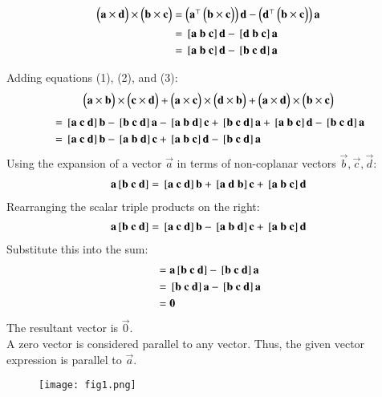\documentclass[journal]{IEEEtran}
\begin{document}
\begin{align}
\myvec{\vec{a} \times\vec{d}} \times\myvec{\vec{b} \times\vec{c}}&=
\myvec{\vec{a}^\top \myvec{\vec{b} \times \vec{c}}} \vec{d} - \myvec{\vec{d}^\top \myvec{\vec{b} \times \vec{c}}} \vec{a}\\
&=\sbrak{\vec{a} \ \vec{b} \ \vec{c}}\vec{d} - \sbrak{\vec{d} \ \vec{b} \ \vec{c}}\vec{a}  \\
&= \sbrak{\vec{a} \ \vec{b} \ \vec{c}}\vec{d} - \sbrak{\vec{b} \ \vec{c} \ \vec{d}}\vec{a}
\end{align}

Adding equations (1), (2), and (3):
\begin{align}
\begin{pmatrix}\mathbf{a} \times\mathbf{b}\end{pmatrix} \times\begin{pmatrix}\mathbf{c} \times\mathbf{d}\end{pmatrix} + \begin{pmatrix}\mathbf{a} \times\mathbf{c}\end{pmatrix} \times\begin{pmatrix}\mathbf{d} \times\mathbf{b}\end{pmatrix} + \begin{pmatrix}\mathbf{a} \times\mathbf{d}\end{pmatrix} \times\begin{pmatrix}\mathbf{b} \times\mathbf{c}\end{pmatrix}\\
\end{align}
\begin{align}
&= \sbrak{\vec{a} \ \vec{c} \ \vec{d}}\vec{b} - \sbrak{\vec{b} \ \vec{c} \ \vec{d}}\vec{a}-\sbrak{\vec{a} \ \vec{b} \ \vec{d}}\vec{c} + \sbrak{\vec{b} \ \vec{c} \ \vec{d}}\vec{a}+\sbrak{\vec{a} \ \vec{b} \ \vec{c}}\vec{d} - \sbrak{\vec{b} \ \vec{c} \ \vec{d}}\vec{a}\\
&= \sbrak{\vec{a} \ \vec{c} \ \vec{d}}\vec{b} - \sbrak{\vec{a} \ \vec{b} \ \vec{d}}\vec{c} + \sbrak{\vec{a} \ \vec{b} \ \vec{c}}\vec{d} - \sbrak{\vec{b} \ \vec{c} \ \vec{d}}\vec{a}
\end{align}
Using the expansion of a vector $\vec{a}$ in terms of non-coplanar vectors $\vec{b}, \vec{c}, \vec{d}$:
\begin{align}
\vec{a}\sbrak{\vec{b} \ \vec{c} \ \vec{d}} = \sbrak{\vec{a} \ \vec{c} \ \vec{d}}\vec{b} + \sbrak{\vec{a} \ \vec{d} \ \vec{b}}\vec{c} + \sbrak{\vec{a} \ \vec{b} \ \vec{c}}\vec{d}
\end{align}
Rearranging the scalar triple products on the right:
\begin{align}
\vec{a}\sbrak{\vec{b} \ \vec{c} \ \vec{d}} = \sbrak{\vec{a} \ \vec{c} \ \vec{d}}\vec{b} - \sbrak{\vec{a} \ \vec{b} \ \vec{d}}\vec{c} + \sbrak{\vec{a} \ \vec{b} \ \vec{c}}\vec{d}
\end{align}
Substitute this into the sum:
\begin{align}
&= \vec{a}\sbrak{\vec{b} \ \vec{c} \ \vec{d}} - \sbrak{\vec{b} \ \vec{c} \ \vec{d}}\vec{a} \\
&= \sbrak{\vec{b} \ \vec{c} \ \vec{d}}\vec{a} - \sbrak{\vec{b} \ \vec{c} \ \vec{d}}\vec{a} \\
&= \vec{0}
\end{align}
The resultant vector is $\vec{0}$.\\ A zero vector is considered parallel to any vector.
Thus, the given vector expression is parallel to $\vec{a}$.



\begin{figure}[H]
   \centering
  \texttt{[image: fig1.png]}
   \caption{}
   \label{fig:1}
\end{figure}
\end{document}
